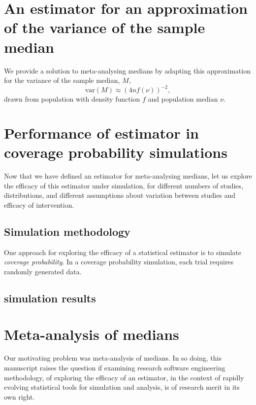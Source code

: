 \documentclass{article}
\begin{document}

\section{An estimator for an approximation of the variance of the sample median}

We provide a solution to meta-analysing medians by adapting this approximation for the variance of the sample median, \(M\),
\[
\mathrm{var}(M) \approx (4nf(\nu))^{-2},
\]
drawn from population with density function \(f\) and population median \(\nu\).

\section{Performance of estimator in coverage probability simulations}

Now that we have defined an estimator for meta-analysing medians, let us explore the efficacy of this estimator under simulation, for different numbers of studies, distributions, and different assumptions about variation between studies and efficacy of intervention.

\subsection{Simulation methodology}

One approach for exploring the efficacy of a statistical estimator is to simulate \emph{coverage probability}. In a coverage probability simulation, each trial requires randomly generated data.


\subsection{simulation results}

\section{Meta-analysis of medians}

Our motivating problem was meta-analysis of medians. In so doing, this manuscript raises the question if examining research software engineering methodology, of exploring the efficacy of an estimator, in the context of rapidly evolving statistical tools for simulation and analysis, is of research merit in its own right.



\end{document}
